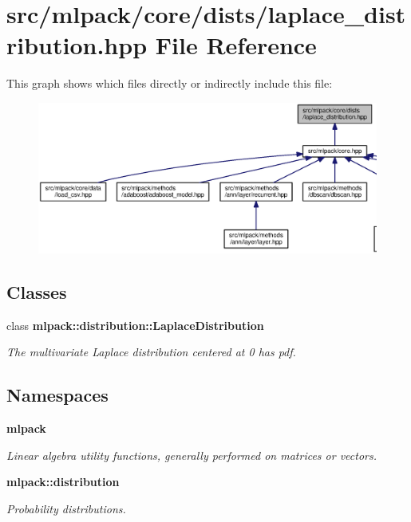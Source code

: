 \section{src/mlpack/core/dists/laplace\+\_\+distribution.hpp File Reference}
\label{laplace__distribution_8hpp}
This graph shows which files directly or indirectly include this file\+:
\nopagebreak
\begin{figure}[H]
\begin{center}
\leavevmode
\includegraphics[width=350pt]{laplace__distribution_8hpp__dep__incl}
\end{center}
\end{figure}
\subsection*{Classes}
\begin{DoxyCompactItemize}
\item 
class {\bf mlpack\+::distribution\+::\+Laplace\+Distribution}
\begin{DoxyCompactList}\small\item\em The multivariate Laplace distribution centered at 0 has pdf. \end{DoxyCompactList}\end{DoxyCompactItemize}
\subsection*{Namespaces}
\begin{DoxyCompactItemize}
\item 
 {\bf mlpack}
\begin{DoxyCompactList}\small\item\em Linear algebra utility functions, generally performed on matrices or vectors. \end{DoxyCompactList}\item 
 {\bf mlpack\+::distribution}
\begin{DoxyCompactList}\small\item\em Probability distributions. \end{DoxyCompactList}\end{DoxyCompactItemize}
